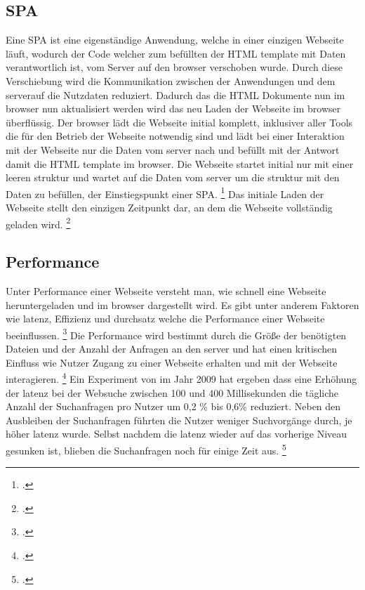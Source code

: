 \subsection{\ac{SPA}}
Eine \ac{SPA} ist eine eigenständige Anwendung, welche in einer einzigen Webseite läuft, wodurch der Code welcher zum befüllten der \ac{HTML} \gls{template}
mit Daten verantwortlich ist, vom Server auf den \gls{browser} verschoben wurde.
Durch diese Verschiebung wird die Kommunikation zwischen der Anwendungen und dem \gls{server}auf die Nutzdaten reduziert.
Dadurch das die \ac{HTML} Dokumente nun im \gls{browser} nun aktualisiert werden wird das neu Laden der Webseite im \gls{browser} überflüssig.
Der \gls{browser} lädt die Webseite initial komplett, inklusiver aller Tools die für den Betrieb der Webseite notwendig sind und lädt bei einer Interaktion mit der Webseite nur die Daten vom \gls{server} nach und befüllt mit der Antwort damit die \ac{HTML} \gls{template} im \gls{browser}.
Die Webseite startet initial nur mit einer leeren \gls{struktur} und wartet auf die Daten vom \gls{server} um die \gls{struktur} mit den Daten zu befüllen, der Einstiegspunkt einer \ac{SPA}. \footcite[Vgl.][Seite 23]{Doguhan2020}
Das initiale Laden der Webseite stellt den einzigen Zeitpunkt dar, an dem die Webseite vollständig geladen wird. \footcite[Vgl.][Seite 4 - 8]{Scott2015}

\subsection{Performance}
Unter Performance einer Webseite versteht man, wie schnell eine Webseite heruntergeladen und im \gls{browser} dargestellt wird.
Es gibt unter anderem Faktoren wie \gls{latenz}, Effizienz und \gls{durchsatz} welche die Performance einer Webseite beeinflussen. \footcite[Vgl.][Seite 53]{Killelea2002}
Die Performance wird bestimmt durch die Größe der benötigten Dateien und der Anzahl der Anfragen an den \gls{server}
und hat einen kritischen Einfluss wie Nutzer Zugang zu einer Webseite erhalten und mit der Webseite interagieren. \footcite[Vgl.][Seite 44]{Robbins2018}
Ein Experiment von  im Jahr 2009 hat ergeben dass eine Erhöhung der \gls{latenz} bei der Websuche zwischen 100 und 400 Millisekunden die tägliche
Anzahl der Suchanfragen pro Nutzer um 0,2 \% bis 0,6\% reduziert.
Neben den Ausbleiben der Suchanfragen führten die Nutzer weniger Suchvorgänge durch, je höher \gls{latenz} wurde.
Selbst nachdem die \gls{latenz} wieder auf das vorherige Niveau gesunken ist, blieben die Suchanfragen noch für einige Zeit aus. \footcite[Vgl.][Seite 1]{Google2009}

